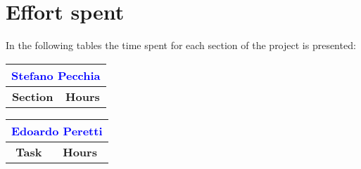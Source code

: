 \chapter{Effort spent}\label{c:effort}
In the following tables the time spent for each section of the project is presented:

\renewcommand\arraystretch{1.5}
\begin{table}[ht]
\centering
\begin{tabular}{|l|l|}
\multicolumn{2}{c}{\textcolor{Blue}{\textbf{Stefano Pecchia}}} \\\hline
\multicolumn{1}{|c|}{\textbf{Section}} & \multicolumn{1}{|c|}{\textbf{Hours}} \\\hline

	\end{tabular} \hspace{2.5em}
	\begin{tabular}{|l|l|}
\multicolumn{2}{c}{\textcolor{Blue}{\textbf{Edoardo Peretti}}} \\\hline
\multicolumn{1}{|c|}{\textbf{Task}} & \multicolumn{1}{|c|}{\textbf{Hours}} \\\hline

\end{tabular}
\end{table}